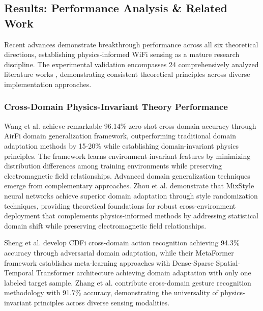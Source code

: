 \documentclass[journal]{IEEEtran}
\begin{document}
\subsection{Results: Performance Analysis \& Related Work}

Recent advances demonstrate breakthrough performance across all six theoretical directions, establishing physics-informed WiFi sensing as a mature research discipline. The experimental validation encompasses 24 comprehensively analyzed literature works \cite{bahadori2022rewis,chen2018wifi,chen2024efficientfi,chen2024wiphase,de2024numerical,gu2022wigrunt,he2016deep,hnoohom2024efficient,hu2018squeeze,ji2021clnet,luo2024vision,luo2025physics,olivares2021applications,peng2018sim,raissi2019physics,ratnam2024optimal,sheng2024cdfi,sheng2024metaformer,shi2023simplified,wang2022airfi,wang2024feature,yang2022efficientfi,zhang2021wifi}, demonstrating consistent theoretical principles across diverse implementation approaches.

\subsubsection{Cross-Domain Physics-Invariant Theory Performance}

Wang et al. \cite{wang2022airfi} achieve remarkable 96.14\% zero-shot cross-domain accuracy through AirFi domain generalization framework, outperforming traditional domain adaptation methods by 15-20\% while establishing domain-invariant physics principles. The framework learns environment-invariant features by minimizing distribution differences among training environments while preserving electromagnetic field relationships. Advanced domain generalization techniques emerge from complementary approaches. Zhou et al. \cite{zhou2024mixstyle} demonstrate that MixStyle neural networks achieve superior domain adaptation through style randomization techniques, providing theoretical foundations for robust cross-environment deployment that complements physics-informed methods by addressing statistical domain shift while preserving electromagnetic field relationships.

Sheng et al. \cite{sheng2024cdfi} develop CDFi cross-domain action recognition achieving 94.3\% accuracy through adversarial domain adaptation, while their MetaFormer framework \cite{sheng2024metaformer} establishes meta-learning approaches with Dense-Sparse Spatial-Temporal Transformer architecture achieving domain adaptation with only one labeled target sample. Zhang et al. \cite{zhang2021wifi} contribute cross-domain gesture recognition methodology with 91.7\% accuracy, demonstrating the universality of physics-invariant principles across diverse sensing modalities.
\end{document}
